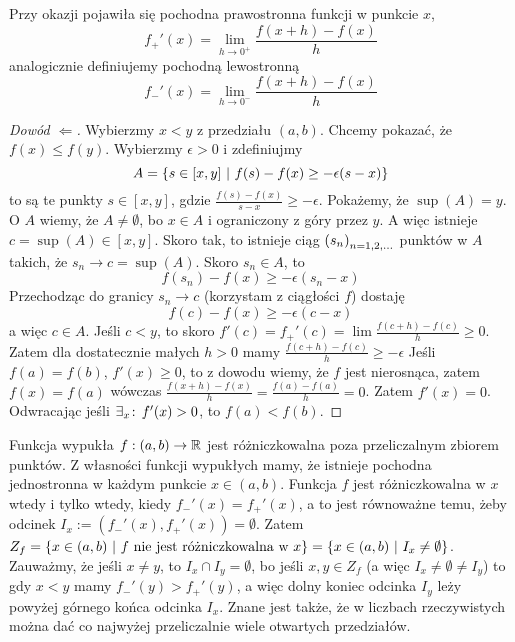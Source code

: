 \documentclass[9pt]{article}
\begin{document}
\begin{Def}
    Przy okazji pojawiła się pochodna prawostronna funkcji w punkcie $x$,
    \[
        f_{+}' (x) = \lim_{h \to 0^+} \frac{f(x+h)-f(x)}{h}
    \]
    analogicznie definiujemy pochodną lewostronną
    \[
        f_{-}' (x) = \lim_{h \to 0^-} \frac{f(x+h)-f(x)}{h}
    \]
\end{Def}

\begin{proof}[Dowód $\Leftarrow$]
    Wybierzmy $x < y$ z przedziału $(a, b)$. Chcemy pokazać, że $f(x) \le f(y)$. Wybierzmy
    $\epsilon > 0$ i zdefiniujmy
    \[
        A = \left\{s \in [x,y] \ |\  f(s)-f(x) \ge -\epsilon (s-x)\right\}
    \]
    to są te punkty $s \in [x, y]$, gdzie $\frac{f(s)-f(x)}{s-x} \ge -\epsilon$. Pokażemy, że
    $\sup (A) = y$. O $A$ wiemy, że $A \ne \emptyset$, bo $x \in A$ i ograniczony z góry przez $y$.
    A więc istnieje $c = \sup (A) \in [x,y]$. Skoro tak, to istnieje ciąg $\left(s_n\right)_{n = 1,2,...}$ punktów w $A$
    takich, że $s_n \to c = \sup (A)$. Skoro $s_n \in A$, to
    \[
        f (s_n) - f(x) \ge -\epsilon (s_n - x)
    \]
    Przechodząc do granicy $s_n \to c$ (korzystam z ciągłości $f$) dostaję
    \[
        f(c) - f(x) \ge -\epsilon (c - x)
    \]
    a więc $c \in A$. Jeśli $c < y$, to skoro $f'(c) = f_+'(c) = \lim \frac{f(c+h)-f(c)}{h} \ge 0$.
    Zatem dla dostatecznie małych $h > 0$ mamy $\frac{f(c+h)-f(c)}{h} \ge -\epsilon$
    Jeśli $f(a) = f(b)$, $f'(x) \ge 0$, to z dowodu wiemy, że $f$ jest nierosnąca, zatem
    $f(x) = f(a)$ wówczas $\frac{f(x+h)-f(x)}{h} = \frac{f(a)-f(a)}{h} = 0$. Zatem $f'(x) = 0$.
    Odwracając jeśli $\exists_{x} \! : \, f'(x) > 0$, to $f(a) < f(b)$.
\end{proof}

\begin{Twi}
    Funkcja wypukła $f: (a,b) \to \mathbb{R}$ jest różniczkowalna poza przeliczalnym zbiorem punktów. Z
    własności funkcji wypukłych mamy, że istnieje pochodna jednostronna w każdym punkcie
    $x \in (a,b)$. Funkcja $f$ jest różniczkowalna w $x$ wtedy i tylko wtedy, kiedy
    $f_-'(x) = f_+'(x)$, a to jest równoważne temu, żeby odcinek
    $I_x := (f_-'(x), f_+'(x)) = \emptyset$. Zatem
    $Z_f = \left\{x \in (a, b) \ |\  f \text{ nie jest różniczkowalna w } x\right\} =
    \left\{x \in (a,b) \ |\  I_x \ne \emptyset\right\}$. Zauważmy, że jeśli $x \ne y$, to
    $I_x \cap I_y = \emptyset$, bo jeśli $x, y \in Z_f$ (a więc $I_x \ne \emptyset \ne I_y$) to gdy
    $x < y$ mamy $f_-'(y) > f_+'(y)$, a więc dolny koniec odcinka $I_y$ leży powyżej górnego końca
    odcinka $I_x$. Znane jest także, że w liczbach rzeczywistych można dać co najwyżej przeliczalnie
    wiele otwartych przedziałów.
\end{Twi}
\end{document}
